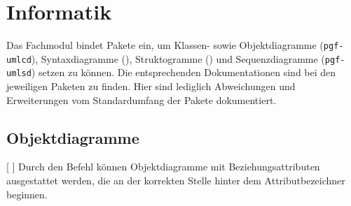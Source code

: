 \section{Informatik}
\label{fach:informatik}
Das Fachmodul  bindet Pakete ein, um Klassen- sowie Objektdiagramme (\texttt{pgf-umlcd}), Syntaxdiagramme (), Struktogramme () und Sequenzdiagramme (\texttt{pgf-umlsd}) setzen zu können. Die entsprechenden Dokumentationen sind bei den jeweiligen Paketen zu finden. Hier sind lediglich Abweichungen und Erweiterungen vom Standardumfang der Pakete dokumentiert.

\subsection{Objektdiagramme}
\begin{commands}
    [ ] Durch den Befehl  können Objektdiagramme mit Beziehungsattributen ausgestattet werden, die an der korrekten Stelle hinter dem Attributbezeichner beginnen.



\end{commands}
